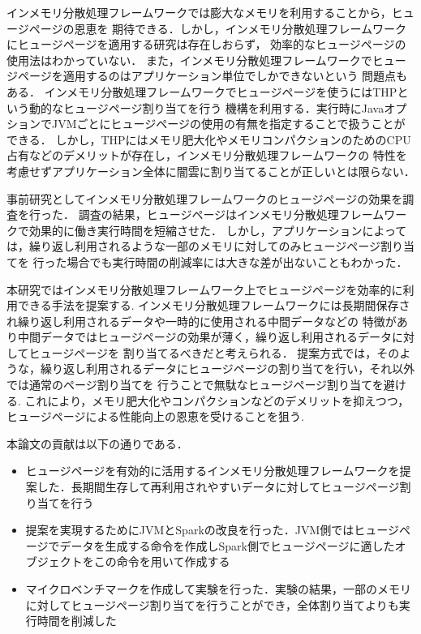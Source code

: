 インメモリ分散処理フレームワークでは膨大なメモリを利用することから，ヒュージページの恩恵を
期待できる．しかし，インメモリ分散処理フレームワークにヒュージページを適用する研究は存在しおらず，
効率的なヒュージページの使用法はわかっていない．
また，インメモリ分散処理フレームワークでヒュージページを適用するのはアプリケーション単位でしかできないという
問題点もある．
インメモリ分散処理フレームワークでヒュージページを使うにはTHPという動的なヒュージページ割り当てを行う
機構を利用する．実行時にJavaオプションでJVMごとにヒュージページの使用の有無を指定することで扱うことができる\cite{java-thp}．
しかし，THPにはメモリ肥大化やメモリコンパクションのためのCPU占有などのデメリットが存在し，インメモリ分散処理フレームワークの
特性を考慮せずアプリケーション全体に闇雲に割り当てることが正しいとは限らない．

事前研究としてインメモリ分散処理フレームワークのヒュージページの効果を調査を行った．
調査の結果，ヒュージページはインメモリ分散処理フレームワークで効果的に働き実行時間を短縮させた．
しかし，アプリケーションによっては，繰り返し利用されるような一部のメモリに対してのみヒュージページ割り当てを
行った場合でも実行時間の削減率には大きな差が出ないこともわかった．

本研究ではインメモリ分散処理フレームワーク上でヒュージページを効率的に利用できる手法を提案する.
インメモリ分散処理フレームワークには長期間保存され繰り返し利用されるデータや一時的に使用される中間データなどの
特徴があり中間データではヒュージページの効果が薄く，繰り返し利用されるデータに対してヒュージページを
割り当てるべきだと考えられる．
提案方式では，そのような，繰り返し利用されるデータにヒュージページの割り当てを行い，それ以外では通常のページ割り当てを
行うことで無駄なヒュージページ割り当てを避ける.
これにより，メモリ肥大化やコンパクションなどのデメリットを抑えつつ，ヒュージページによる性能向上の恩恵を受けることを狙う.

本論文の貢献は以下の通りである．
\begin{itemize}
  \item ヒュージページを有効的に活用するインメモリ分散処理フレームワークを提案した．長期間生存して再利用されやすいデータに対してヒュージページ割り当てを行う
  \item 提案を実現するためにJVMとSparkの改良を行った．JVM側ではヒュージページでデータを生成する命令を作成しSpark側でヒュージページに適したオブジェクトをこの命令を用いて作成する
  \item マイクロベンチマークを作成して実験を行った．実験の結果，一部のメモリに対してヒュージページ割り当てを行うことができ，全体割り当てよりも実行時間を削減した
\end{itemize}
